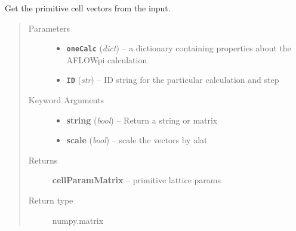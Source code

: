 \documentclass[letterpaper,10pt,english]{sphinxmanual}
\begin{document}

\begin{fulllineitems}
\label{retr:retr.getCellMatrixFromInput}
Get the primitive cell vectors from the input.
\begin{quote}\begin{description}
\item[{Parameters}] \leavevmode\begin{itemize}
\item {} 
\textbf{\texttt{oneCalc}} (\emph{dict}) -- a dictionary containing properties about the AFLOWpi calculation

\item {} 
\textbf{\texttt{ID}} (\emph{str}) -- ID string for the particular calculation and step

\end{itemize}

\item[{Keyword Arguments}] \leavevmode\begin{itemize}
\item {} 
\textbf{string} (\emph{bool}) --
Return a string or matrix

\item {} 
\textbf{scale} (\emph{bool}) --
scale the vectors by alat

\end{itemize}

\item[{Returns}] \leavevmode
\textbf{cellParamMatrix} --
primitive lattice params

\item[{Return type}] \leavevmode
numpy.matrix

\end{description}\end{quote}

\end{fulllineitems}

\end{document}
